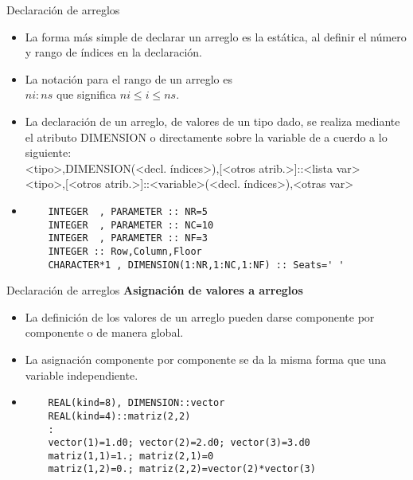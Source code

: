 \begin{frame}[fragile]{Declaración de arreglos}
 \begin{itemize}[<+(0)->]
 \item La forma más simple de declarar un arreglo es la estática, al definir el número y rango de índices en la declaración.
 \item La notación para el rango de un arreglo es\\ 
  \centering $ni:ns$ que significa $ni \leq i \leq ns$.
 \item La declaración de un arreglo, de valores de un tipo dado, se realiza mediante el atributo DIMENSION o directamente sobre la variable de a cuerdo a lo siguiente: \\ 
 \vspace{0.1cm}
  <tipo>,DIMENSION(<decl. índices>),[<otros atrib.>]::<lista var> \\ 
  <tipo>,[<otros atrib.>]::<variable>(<decl. índices>),<otras var>    
 \vspace{0.2cm}
  \item []
  \begin{verbatim}
    INTEGER  , PARAMETER :: NR=5
    INTEGER  , PARAMETER :: NC=10
    INTEGER  , PARAMETER :: NF=3
    INTEGER :: Row,Column,Floor
    CHARACTER*1 , DIMENSION(1:NR,1:NC,1:NF) :: Seats=' '
  \end{verbatim}        
 \end{itemize}
\end{frame} 


\begin{frame}[fragile]{Declaración de arreglos}
\textbf{Asignación de valores a arreglos}
 \begin{itemize}[<+(1)->]
 \item La definición de los valores de un arreglo pueden darse componente por componente o de manera global.
 \item La asignación componente por componente se da la misma forma que una variable independiente.
 \vspace{0.15 cm}
 \item[]
   \begin{verbatim}
    REAL(kind=8), DIMENSION::vector
    REAL(kind=4)::matriz(2,2)
    :
    vector(1)=1.d0; vector(2)=2.d0; vector(3)=3.d0
    matriz(1,1)=1.; matriz(2,1)=0
    matriz(1,2)=0.; matriz(2,2)=vector(2)*vector(3)
   \end{verbatim}
 \end{itemize}
\end{frame} 


